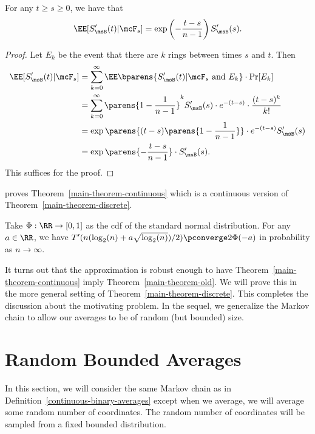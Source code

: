 \documentclass[12pt]{article}
\begin{document}
\begin{prop}
	For any $t \geq s \geq 0$, we have that 
	\[
		\EE[S'_\msB(t) | \mcF_s ] = \exp \left ( - \frac{t-s}{n-1} \right ) S'_\msB(s).	
	\]
\end{prop}
\begin{proof}
	Let $E_k$ be the event that there are $k$ rings between times $s$ and $t$. Then 
	\begin{align*}
		\EE [ S'_\msB(t) | \mcF_s ] & = \sum_{k = 0}^\infty \EE \bparens{S'_\msB(t) | \mcF_s \text{ and } E_k} \cdot \Pr[E_k] \\
		& = \sum_{k = 0}^\infty \parens{1 - \frac{1}{n-1}}^k S'_\msB(s) \cdot e^{-(t-s)} \cdot \frac{(t-s)^k}{k!} \\
		& = \exp \parens{ (t-s) \parens{1 - \frac{1}{n-1}}} \cdot e^{-(t-s)} S'_\msB(s) \\
		& = \exp \parens{- \frac{t-s}{n-1}} \cdot S'_\msB(s). 
	\end{align*}
	This suffices for the proof. 
\end{proof}

\cite{chatterjee2021phase} proves Theorem~\ref{main-theorem-continuous} which is a continuous version of Theorem~\ref{main-theorem-discrete}.

\begin{thm} \label{main-theorem-continuous}
	Take $\Phi : \RR \to [0, 1]$ as the cdf of the standard normal distribution. For any $a \in \RR$, we have $T'(n (\log_2(n) +a \sqrt{\log_2(n)})/2) \pconverge 2 \Phi(-a)$ in probability as $n \to \infty$. 
\end{thm}

It turns out that the approximation is robust enough to have Theorem~\ref{main-theorem-continuous} imply Theorem~\ref{main-theorem-old}. We will prove this in the more general setting of Theorem~\ref{main-theorem-discrete}. This completes the discussion about the motivating problem. In the sequel, we generalize the Markov chain to allow our averages to be of random (but bounded) size.  

\section{Random Bounded Averages}

In this section, we will consider the same Markov chain as in Definition~\ref{continuous-binary-averages} except when we average, we will average some random number of coordinates. The random number of coordinates will be sampled from a fixed bounded distribution.  
\end{document}
